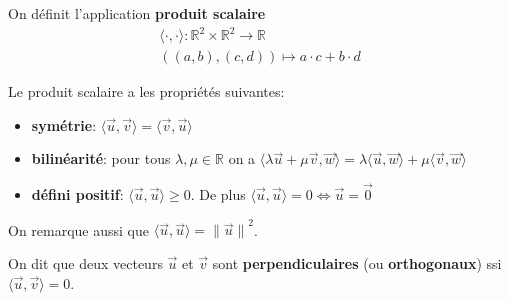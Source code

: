 \documentclass{book}
\numberwithin{equation}{section}
\providecommand{\plan}{{\mathbb R^2}}
\providecommand{\origin}{{\vec 0}}
\providecommand{\longueur}[1]{{\lVert#1\rVert}}
\providecommand{\scalaire}[1]{{\langle#1\rangle}}
\begin{document}
\begin{defn}
	On définit l'application \textbf{produit scalaire}
	\begin{align*}
		\scalaire{\cdot, \cdot}: \plan \times \plan \to \mathbb R\\
		((a, b), (c, d)) \mapsto a \cdot c + b \cdot d
	\end{align*}
\end{defn}

\begin{prop}
	Le produit scalaire a les propriétés suivantes:
	\begin{itemize}
		\item \textbf{symétrie}: $\scalaire{\vec u, \vec v} = \scalaire{\vec v, \vec u}$
		\item \textbf{bilinéarité}: pour tous $\lambda, \mu \in \mathbb R$ on a $\scalaire{\lambda\vec u + \mu\vec v, \vec w} = \lambda\scalaire{\vec u, \vec w} + \mu\scalaire{\vec v, \vec w}$
		\item \textbf{défini positif}: $\scalaire{\vec u, \vec u} \geq 0$. De plus $\scalaire{\vec u, \vec u} = 0 \iff \vec u = \origin$
	\end{itemize}
	On remarque aussi que $\scalaire{\vec u, \vec u} = \longueur{\vec u}^2$.
\end{prop}

\begin{defn}
	On dit que deux vecteurs $\vec u$ et $\vec v$ sont \textbf{perpendiculaires} (ou \textbf{orthogonaux}) ssi $\scalaire{\vec u,  \vec v} = 0$.
\end{defn}
\end{document}
